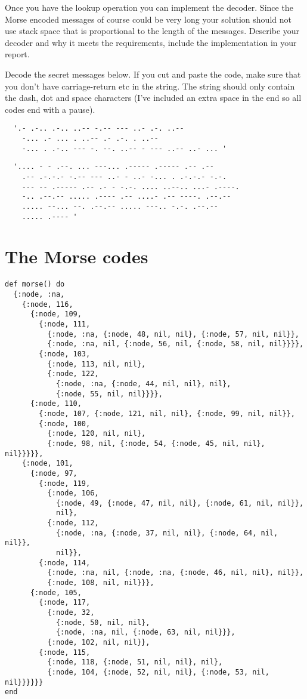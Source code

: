 \documentclass[a4paper,11pt]{article}
\begin{document}
Once you have the lookup operation you can implement the
decoder. Since the Morse encoded messages of course could be very long
your solution should not use stack space that is proportional to the
length of the messages. Describe your decoder and why it meets the
requirements, include the implementation in your report.

Decode the secret messages below. If you cut and paste the code, make
sure that you don't have carriage-return etc in the string. The string
should only contain the dash, dot and space characters (I've included
an extra space in the end so all codes end with a pause).

\begin{verbatim}
  '.- .-.. .-.. ..-- -.-- --- ..- .-. ..-- 
    -... .- ... . ..-- .- .-. . ..-- 
    -... . .-.. --- -. --. ..-- - --- ..-- ..- ... '
\end{verbatim}

\begin{verbatim}
  '.... - - .--. ... ---... .----- .----- .-- .-- 
    .-- .-.-.- -.-- --- ..- - ..- -... . .-.-.- -.-. 
    --- -- .----- .-- .- - -.-. .... ..--.. ...- .----. 
    -.. .--.-- ..... .---- .-- ....- .-- ----. .--.-- 
    ..... --... --. .--.-- ..... ---.. -.-. .--.-- 
    ..... .---- '
\end{verbatim}


\pagebreak

\section*{The Morse codes}

\begin{verbatim}
def morse() do
  {:node, :na,
    {:node, 116,
      {:node, 109,
        {:node, 111,
          {:node, :na, {:node, 48, nil, nil}, {:node, 57, nil, nil}},
          {:node, :na, nil, {:node, 56, nil, {:node, 58, nil, nil}}}},
        {:node, 103,
          {:node, 113, nil, nil},
          {:node, 122,
            {:node, :na, {:node, 44, nil, nil}, nil},
            {:node, 55, nil, nil}}}},
      {:node, 110,
        {:node, 107, {:node, 121, nil, nil}, {:node, 99, nil, nil}},
        {:node, 100,
          {:node, 120, nil, nil},
          {:node, 98, nil, {:node, 54, {:node, 45, nil, nil}, nil}}}}},
    {:node, 101,
      {:node, 97,
        {:node, 119,
          {:node, 106,
            {:node, 49, {:node, 47, nil, nil}, {:node, 61, nil, nil}},
            nil},
          {:node, 112,
            {:node, :na, {:node, 37, nil, nil}, {:node, 64, nil, nil}},
            nil}},
        {:node, 114,
          {:node, :na, nil, {:node, :na, {:node, 46, nil, nil}, nil}},
          {:node, 108, nil, nil}}},
      {:node, 105,
        {:node, 117,
          {:node, 32,
            {:node, 50, nil, nil},
            {:node, :na, nil, {:node, 63, nil, nil}}},
          {:node, 102, nil, nil}},
        {:node, 115,
          {:node, 118, {:node, 51, nil, nil}, nil},
          {:node, 104, {:node, 52, nil, nil}, {:node, 53, nil, nil}}}}}}
end
\end{verbatim}

\pagebreak
\end{document}
